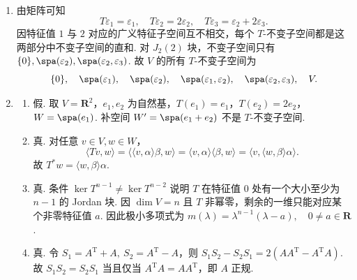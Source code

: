 \begin{enumerate}
\begin{enumerate}
        \item 设 $\beta=(a,b,c)$. 由
        \[
            \langle x,\beta\rangle=x_1a+x_2b+(x_2+x_3)(b+c)
        \]
        与 $x_1+2x_2$ 比较系数，得 $\begin{cases}
            a=1,\\
            b+2(b+c)=2,\\
            b+c=0.
         \end{cases}$ 解得 $a=1,b=2,c=-2$，故 $\beta=(1,2,-2)$.
    \end{enumerate}

    \item 由矩阵可知
    \[
        T\varepsilon_1=\varepsilon_1,\quad
        T\varepsilon_2=2\varepsilon_2,\quad
        T\varepsilon_3=\varepsilon_2+2\varepsilon_3.
    \]
    因特征值 $1$ 与 $2$ 对应的广义特征子空间互不相交，每个 $T$-不变子空间都是这两部分中不变子空间的直和. 对 $J_2(2)$ 块，不变子空间只有 $\{0\}, \spa(\varepsilon_2), \spa(\varepsilon_2,\varepsilon_3)$. 故 $V$ 的所有 $T$-不变子空间为
    \[
        \{0\},\quad
        \spa(\varepsilon_1),\quad
        \spa(\varepsilon_2),\quad
        \spa(\varepsilon_1,\varepsilon_2),\quad
        \spa(\varepsilon_2,\varepsilon_3),\quad
        V.
    \]

    \item
    \begin{enumerate}
        \item 假. 取 $V=\mathbf{R}^2$，$e_1, e_2$ 为自然基，$T(e_1)=e_1$，$T(e_2)=2e_2$，$W=\spa(e_1)$. 补空间 $W'=\spa(e_1+e_2)$ 不是 $T$-不变子空间.

        \item 真. 对任意 $v\in V,w\in W$，
        \[
            \langle Tv,w\rangle=\langle \langle v,\alpha\rangle\beta,w\rangle
            =\langle v,\alpha\rangle\langle\beta,w\rangle
            =\langle v,\langle w,\beta\rangle\alpha\rangle.
        \]
        故 $T^*w=\langle w,\beta\rangle\alpha$.

        \item 真. 条件 $\ker T^{n-1}\neq\ker T^{n-2}$ 说明 $T$ 在特征值 $0$ 处有一个大小至少为 $n-1$ 的 Jordan 块. 因 $\dim V=n$ 且 $T$ 非幂零，剩余的一维只能对应某个非零特征值 $a$. 因此极小多项式为 $m(\lambda)=\lambda^{n-1}(\lambda-a),\quad 0 \neq a \in \mathbf{R}$.

        \item 真. 令 $S_1=A^{\mathrm{T}}+A,\ S_2=A^{\mathrm{T}}-A$，则 $S_1S_2-S_2S_1=2(AA^{\mathrm{T}}-A^{\mathrm{T}}A)$. 故 $S_1S_2=S_2S_1$ 当且仅当 $A^{\mathrm{T}}A=AA^{\mathrm{T}}$，即 $A$ 正规.


\end{enumerate}
\end{enumerate}
